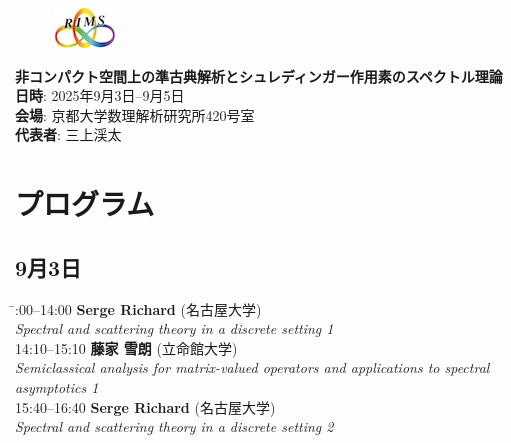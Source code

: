 \documentclass[a4paper,11pt]{article}
\numberwithin{equation}{section}
\begin{document}
\pagestyle{empty}



\begin{figure}
  \centering
  \includegraphics[bb=0 0 0.2 0.15]{mugenRIMS2.jpg}
\end{figure}

\begin{center}
{\fontsize{16pt}{18pt}\selectfont \bfseries 非コンパクト空間上の準古典解析とシュレディンガー作用素のスペクトル理論}\\
  \textbf{日時}: 2025年9月3日--9月5日\\
  \textbf{会場}: 京都大学数理解析研究所420号室\\
  \textbf{代表者}:  三上渓太
\end{center}

\section*{プログラム}

\subsection*{9月3日}
\begin{tabbing}
  \hspace{3cm}\=:00--14:00 \> \textbf{Serge Richard}  (名古屋大学)\\
                \> \emph{Spectral and scattering theory in a discrete setting 1}\\

  14:10--15:10 \> \textbf{藤家 雪朗}  (立命館大学)\\
                \> \emph{Semiclassical analysis for matrix-valued operators
and applications to spectral}\\
               \> \emph{ asymptotics 1}\\

  15:40--16:40 \> \textbf{Serge Richard}  (名古屋大学)\\
                \> \emph{Spectral and scattering theory in a discrete setting 2}
\end{tabbing}
\end{document}
